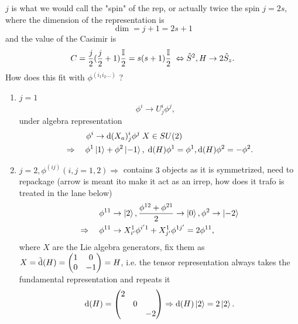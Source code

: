 $j$ is what we would call the "spin" of the rep, or actually twice the spin $j=2s$, where the dimension of the representation is
\begin{equation*}
	\dim = j+1 =2s+1
\end{equation*}
and the value of the Casimir is
\begin{equation*}
	C = \frac{j}{2}(\frac{j}{2} +1) \frac{\mathbb{I}}{2} = s(s+1) \frac{\mathbb{I}}{2} \; \Leftrightarrow \hat{ S}^2, H\rightarrow 2\hat{ S}_z.
\end{equation*}
How does this fit with $\phi^{(i_1 i_2 \dots)}$ ?
\begin{enumerate}
	\item $j=1$
	\begin{equation*}
			\phi^i \rightarrow U^i_j \phi^j, \quad 
	\end{equation*}
under algebra representation
	\begin{align*}
	\phi^i&\rightarrow \mathrm{d}(X_a)^i_j \phi^j \; X\in SU(2) \\
	\Rightarrow\quad	\phi^1&\ket{1}+\phi^2\ket{-1}, \; \mathrm{d}(H) \phi^1=\phi^1, \mathrm{d}(H)\phi^2=-\phi^2.
	\end{align*}
\item $j=2, \phi^{(ij)} (i,j=1,2)\Rightarrow$ contains $3$ objects as it is symmetrized, need to repackage (arrow is meant ito make it act as an irrep, how does it trafo is treated in the lane below)
\begin{align*}
	\phi^{11} &\rightarrow \ket{2}, \frac{\phi^{12}+\phi^{21}}{2}\rightarrow\ket{0},\phi^2\rightarrow\ket{-2}\\
	\Rightarrow \quad \phi^{11} &\rightarrow X^1_{i^\prime} \phi^{i^\prime 1} + X^1_{j^\prime} \phi^{1j^\prime} = 2 \phi^{11},
\end{align*}
where $X$ are the Lie algebra generators, fix them as $X=\tilde{\mathrm{d}}(H) =\begin{pmatrix}
1&0\\
0&-1\\
\end{pmatrix}=H$, i.e. the tensor representation always takes the fundamental representation and repeats it
\begin{equation*}
	\mathrm{d}(H) = \begin{pmatrix}
		2&&\\
		&0&\\
		&&-2 \\
	\end{pmatrix}\Rightarrow
\mathrm{d}(H) \ket{2} = 2 \ket{2}.
\end{equation*}
\end{enumerate}

